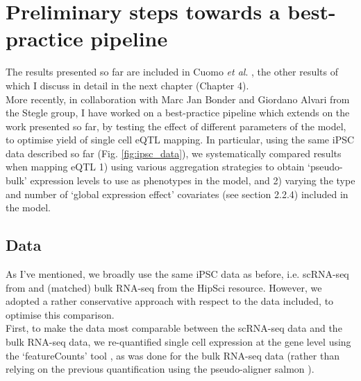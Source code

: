 \clearpage

\section{Preliminary steps towards a best-practice pipeline}

The results presented so far are included in Cuomo \textit{et al}. \cite{cuomo2020single}, the other results of which I discuss in detail in the next chapter (Chapter 4). \\

More recently, in collaboration with Marc Jan Bonder and Giordano Alvari from the Stegle group, I have worked on a best-practice pipeline which extends on the work presented so far, by testing the effect of different parameters of the model, to optimise yield of single cell eQTL mapping.
In particular, using the same iPSC data described so far (Fig. \ref{fig:ipsc_data}), we systematically compared results when mapping eQTL 1) using various aggregation strategies to obtain `pseudo-bulk' expression levels to use as phenotypes in the model, and 2) varying
the type and number of `global expression effect' covariates (see section
2.2.4) included in the model.

\subsection{Data}

As I've mentioned, we broadly use the same iPSC data as before, i.e. scRNA-seq from \cite{cuomo2020single} and (matched) bulk RNA-seq from the HipSci resource.
However, we adopted a rather conservative approach with respect to the data included, to optimise this comparison. \\

First, to make the data most comparable between the scRNA-seq data and the bulk RNA-seq data, we re-quantified single cell expression at the gene level using the `featureCounts' tool \cite{liao2014featurecounts}, as was done for the bulk RNA-seq data (rather than relying on the previous quantification using the pseudo-aligner salmon \cite{patro2017salmon}).
\\


